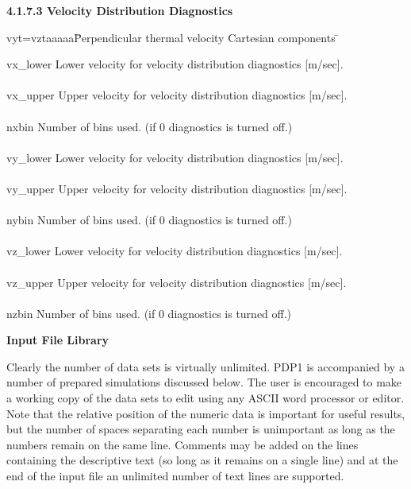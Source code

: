 \begin{section}
\begin{subsection}
\begin{subsubsection}
\noindent
{\bf 4.1.7.3 Velocity Distribution Diagnostics} \\
\begin{tabbing}
         vyt=vztaaaaa\= Perpendicular thermal velocity Cartesian
components \= \kill

 vx\_lower \> Lower velocity for velocity distribution diagnostics [m/sec]. \> \\
\\ vx\_upper  \> Upper velocity for velocity distribution diagnostics [m/sec].  \> \\
\\ nxbin \> Number of bins used. (if 0 diagnostics is turned off.) \> \\
\\ vy\_lower \> Lower velocity for velocity distribution diagnostics [m/sec]. \> \\
\\ vy\_upper  \> Upper velocity for velocity distribution diagnostics [m/sec].  \> \\
\\ nybin \> Number of bins used. (if 0 diagnostics is turned off.) \> \\
\\ vz\_lower \> Lower velocity for velocity distribution diagnostics [m/sec]. \> \\
\\ vz\_upper  \> Upper velocity for velocity distribution diagnostics [m/sec].  \> \\
\\ nzbin \> Number of bins used. (if 0 diagnostics is turned off.) \> \\
\end{tabbing}

\end{subsubsection}
\end{subsection}

\begin{subsection}
{\bf Input File Library}

   Clearly the number of data sets is virtually unlimited.  PDP1 is
accompanied by a number of prepared simulations discussed below.  The
user is encouraged to make a working copy of the data sets to edit
using any ASCII word processor or editor.  Note that the relative
position of the numeric data is important for useful results, but the
number of spaces separating each number is unimportant as long as the
numbers remain on the same line.  Comments may be added on the lines
containing the descriptive text (so long as it remains on a single
line) and at the end of the input file an unlimited number of text
lines are supported.


\end{subsection}
\end{section}
